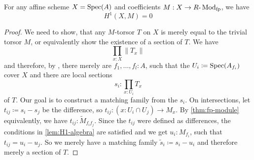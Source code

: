 \begin{theorem}
  For any affine scheme $X=\operatorname{Spec}(A)$ and coefficients $M: X\to R\text{-}\operatorname{Mod}_{\text{fp}}$, we have
  \[ H^1(X,M)=0 \]
\end{theorem}
\begin{proof}
  We need to show, that any $M$-torsor $T$ on $X$ is merely equal to the trivial torsor $M$,
  or equivalently show the existence of a section of $T$.
  We have
  \[ \prod_{x:X}\| T_x \|\]
  and therefore, by ,
  there merely are $f_1,\dots,f_l:A$,
  such that the $U_i\coloneqq \operatorname{Spec}(A_{f_i})$ cover $X$ and
  there are local sections
  \[ s_i:\prod_{x:U_i}T_x\]
  of $T$. Our goal is to construct a matching family from the $s_i$.
  On intersections, let $t_{ij}\coloneqq s_i-s_j$ be the difference, so $t_{ij}:(x : U_i\cap U_j) \to M_x$.
  By \cref{thm:fp-module} equivalently, we have $t_{ij}:\tilde{M}_{f_i f_j}$.
  Since the $t_{ij}$ were defined as differences, the conditions in \cref{lem:H1-algebra} are satisfied and we get
  $u_i:M_{f_i}$, such that $t_{ij}=u_i-u_j$.
  So we merely have a matching family $\tilde{s}_i\coloneqq s_i-u_i$ and therefore merely a section of $T$.
\end{proof}